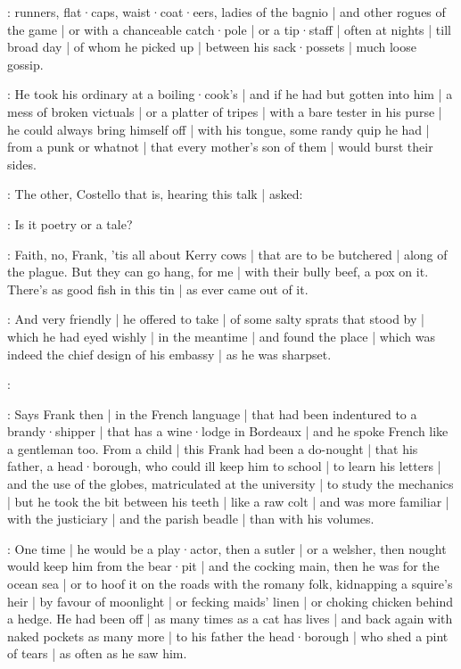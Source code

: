 :
runners,
flat·caps,
waist·coat·eers,
ladies of the bagnio |
and other rogues of the game |
or with a chanceable catch·pole |
or a tip·staff |
often at nights |
till broad day |
of whom he picked up |
between his sack·possets |
much loose gossip.

:
He took his ordinary at a boiling·cook's |
and if he had but gotten into him |
a mess of broken victuals |
or a platter of tripes |
with a bare tester in his purse |
he could always bring himself off |
with his tongue,
some randy quip he had |
from a punk or whatnot |
that every mother's son of them |
would burst their sides.

:
The other,
Costello that is,
hearing this talk |
asked:

\punch:
Is it poetry or a tale?

\lenehan:
Faith,
no,
Frank,
'tis all about Kerry cows |
that are to be butchered |
along of the plague.
But they can go hang,
for me |
with their bully beef,
a pox on it.
There's as good fish in this tin |
as ever came out of it.

:
And very friendly |
he offered to take |
of some salty sprats that stood by |
which he had eyed wishly |
in the meantime |
and found the place |
which was indeed the chief design of his embassy |
as he was sharpset.

\punch:

:
Says Frank then |
in the French language |
that had been indentured to a brandy·shipper |
that has a wine·lodge in Bordeaux |
and he spoke French like a gentleman too.
From a child |
this Frank had been a do-nought |
that his father,
a head·borough,
who could ill keep him to school |
to learn his letters |
and the use of the globes,
matriculated at the university |
to study the mechanics |
but he took the bit between his teeth |
like a raw colt |
and was more familiar |
with the justiciary |
and the parish beadle |
than with his volumes.

:
One time |
he would be a play·actor,
then a sutler |
or a welsher,
then nought would keep him from the bear·pit |
and the cocking main,
then he was for the ocean sea |
or to hoof it on the roads with the romany folk,
kidnapping a squire's heir |
by favour of moonlight |
or fecking maids' linen |
or choking chicken behind a hedge.
He had been off |
as many times as a cat has lives |
and back again with naked pockets as many more |
to his father the head·borough |
who shed a pint of tears |
as often as he saw him.

